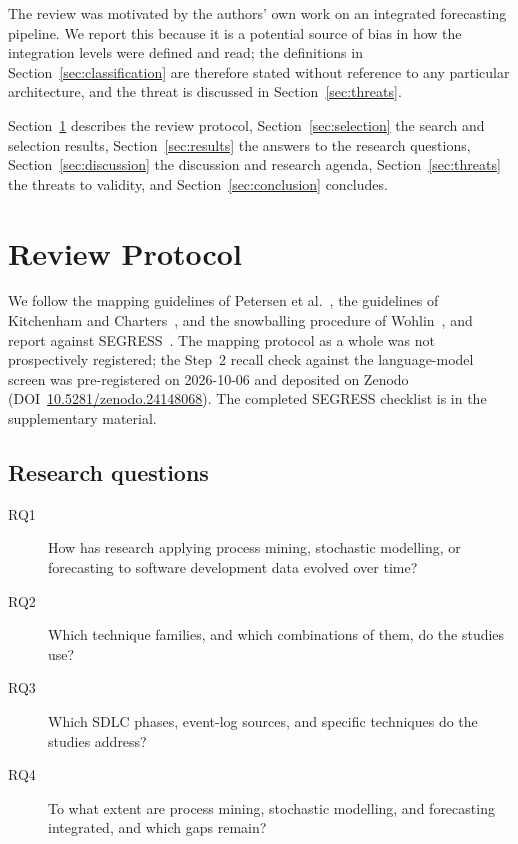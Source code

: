 \documentclass[preprint,12pt,authoryear=false]{elsarticle}
\begin{document}
The review was motivated by the authors' own work on an integrated forecasting pipeline. We report this because it is a potential source of bias in how the integration levels were defined and read; the definitions in Section~\ref{sec:classification} are therefore stated without reference to any particular architecture, and the threat is discussed in Section~\ref{sec:threats}.

Section~\ref{sec:method} describes the review protocol, Section~\ref{sec:selection} the search and selection results, Section~\ref{sec:results} the answers to the research questions, Section~\ref{sec:discussion} the discussion and research agenda, Section~\ref{sec:threats} the threats to validity, and Section~\ref{sec:conclusion} concludes.

\section{Review Protocol}\label{sec:method}

We follow the mapping guidelines of Petersen et al.~\cite{petersen2015}, the guidelines of Kitchenham and Charters~\cite{kitchenham2007}, and the snowballing procedure of Wohlin~\cite{wohlin2014}, and report against SEGRESS~\cite{segress}. The mapping protocol as a whole was not prospectively registered; the Step~2 recall check against the language-model screen was pre-registered on 2026-10-06 and deposited on Zenodo (DOI~\href{https://doi.org/10.5281/zenodo.24148068}{10.5281/zenodo.24148068}). The completed SEGRESS checklist is in the supplementary material.

\subsection{Research questions}\label{sec:rqs}

\begin{description}
\item[RQ1] How has research applying process mining, stochastic modelling, or forecasting to software development data evolved over time?
\item[RQ2] Which technique families, and which combinations of them, do the studies use?
\item[RQ3] Which SDLC phases, event-log sources, and specific techniques do the studies address?
\item[RQ4] To what extent are process mining, stochastic modelling, and forecasting integrated, and which gaps remain?
\end{description}
\end{document}
